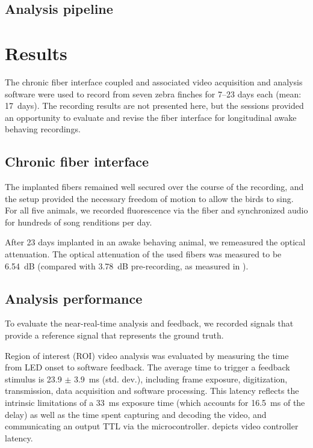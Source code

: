 \subsection{Analysis pipeline}


\section{Results}

The chronic fiber interface coupled and associated video 
acquisition and analysis software were used to record 
from seven zebra finches for 7--23 days each (mean: 
17~days). The recording results are not 
presented here, but the sessions provided an opportunity to 
evaluate and revise the fiber interface for longitudinal 
awake behaving recordings.

\subsection{Chronic fiber interface}

The implanted fibers remained well secured over the 
course of the recording, and the setup provided the 
necessary freedom of motion to allow the birds to 
sing. For all five animals, we recorded fluorescence 
via the fiber and synchronized audio for hundreds 
of song renditions per day.

After 23 days implanted in an awake behaving animal,
we remeasured the optical attenuation. The optical 
attenuation of the used fibers was measured to be 
6.54~dB (compared with 3.78~dB pre-recording, as 
measured in ).

\subsection{Analysis performance}

To evaluate the near-real-time analysis and feedback, we recorded 
signals that provide a reference signal that represents the 
ground truth. 

Region of interest (ROI) video analysis was evaluated by measuring the
time from LED onset to software feedback. The average time to trigger 
a feedback stimulus is 23.9 $\pm$ 3.9~ms (std. dev.), 
including frame exposure, digitization, transmission, data acquisition 
and software processing. This latency reflects the intrinsic 
limitations of a 33~ms exposure time (which accounts for 16.5~ms of 
the delay) as well as the time spent capturing and decoding the video, 
and communicating an output TTL via the microcontroller. 
 depicts video controller latency.

